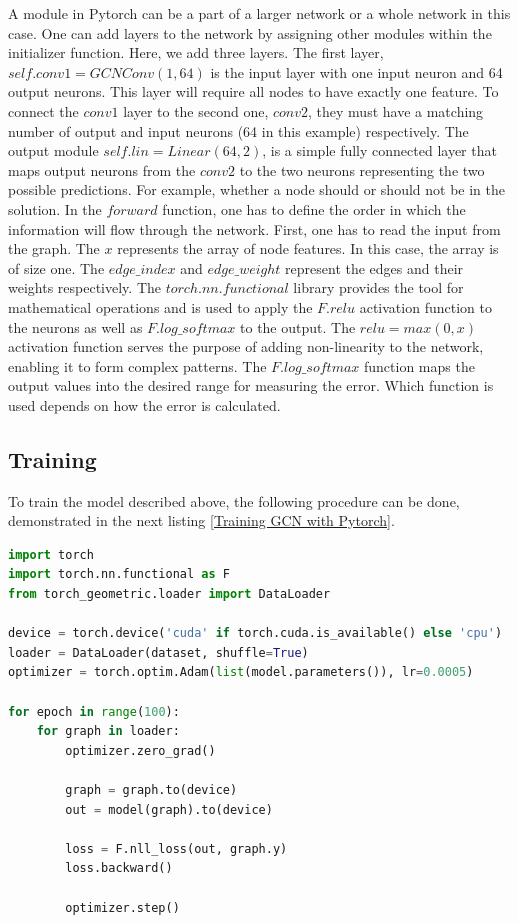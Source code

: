 A module in Pytorch can be a part of a larger network or a whole network in this case. One can add layers to the network by assigning other modules within the initializer function. Here, we add three layers. The first layer, $self.conv1 = GCNConv(1,64)$ is the input layer with one input neuron and 64 output neurons. This layer will require all nodes to have exactly one feature. To connect the $conv1$ layer to the second one, $conv2$, they must have a matching number of output and input neurons (64 in this example) respectively. The output module $self.lin = Linear(64, 2)$, is a simple fully connected layer that maps output neurons from the $conv2$ to the two neurons representing the two possible predictions. For example, whether a node should or should not be in the solution. In the $forward$ function, one has to define the order in which the information will flow through the network. First, one has to read the input from the graph. The $x$ represents the array of node features. In this case, the array is of size one. The $edge\_index$ and $edge\_weight$ represent the edges and their weights respectively. The $torch.nn.functional$ library provides the tool for mathematical operations and is used to apply the $F.relu$ activation function to the neurons as well as $F.log\_softmax$ to the output. The $relu = max(0,x)$ activation function serves the purpose of adding non-linearity to the network, enabling it to form complex patterns. The $F.log\_softmax$ function maps the output values into the desired range for measuring the error. Which function is used depends on how the error is calculated.

\subsection{Training}

To train the model described above, the following procedure can be done, demonstrated in the next listing \ref{Training GCN with Pytorch}. 

\begin{lstlisting}[caption={Training GCN with Pytorch}, label={Training GCN with Pytorch}, language=Python]
import torch
import torch.nn.functional as F
from torch_geometric.loader import DataLoader

device = torch.device('cuda' if torch.cuda.is_available() else 'cpu')
loader = DataLoader(dataset, shuffle=True)
optimizer = torch.optim.Adam(list(model.parameters()), lr=0.0005)

for epoch in range(100):        
    for graph in loader:
        optimizer.zero_grad()
        
        graph = graph.to(device)
        out = model(graph).to(device)   
            
        loss = F.nll_loss(out, graph.y)
        loss.backward()

        optimizer.step()
\end{lstlisting}

